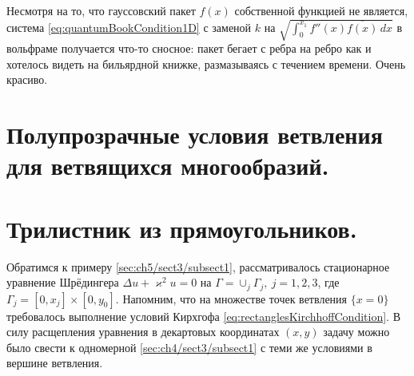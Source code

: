\begin{statement}
Несмотря на то, что гауссовский пакет $f(x)$ собственной функцией не является, система \eqref{eq:quantumBookCondition1D} с заменой $k$ на $\sqrt{ \int_0^{x_1} f''(x) \overline{f(x)}\, dx}$ в вольфраме получается что-то сносное: пакет бегает с ребра на ребро как и хотелось видеть на бильярдной книжке, размазываясь с течением времени. Очень красиво.
\end{statement}

\section{Полупрозрачные условия ветвления для ветвящихся многообразий.}\label{sec:ch7/sect2}
\section{Трилистник из прямоугольников.}\label{sec:ch7/sect2/subsect1}
Обратимся к примеру \ref{sec:ch5/sect3/subsect1}, рассматривалось стационарное уравнение Шрёдингера $\Delta u + \varkappa^2 u = 0$ на $\Gamma = \cup_j \Gamma_j, \ j=1,2,3$, где $\Gamma_j= [0,x_j] \times [0,y_0]$. 
Напомним, что на множестве точек ветвления $\{x=0\}$ требовалось выполнение условий Кирхгофа \eqref{eq:rectanglesKirchhoffCondition}. 
В силу расщепления уравнения в декартовых координатах $(x,y)$ задачу можно было свести к одномерной \ref{sec:ch4/sect3/subsect1} с теми же условиями в вершине ветвления. 


